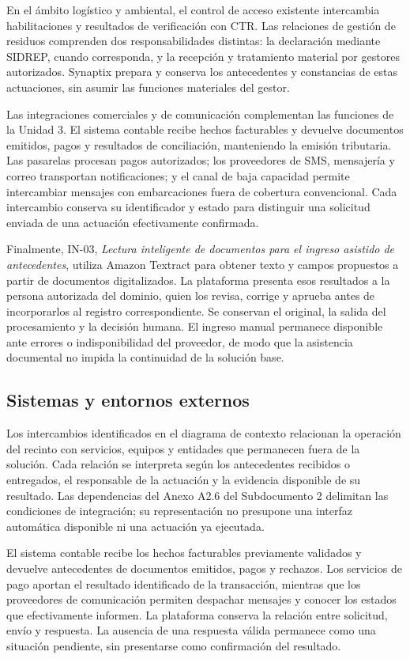 En el ámbito logístico y ambiental, el control de acceso
existente intercambia habilitaciones y resultados de verificación
con CTR. Las relaciones de gestión de residuos comprenden
dos responsabilidades distintas: la declaración mediante SIDREP,
cuando corresponda, y la recepción y tratamiento material
por gestores autorizados. Synaptix prepara y conserva
los antecedentes y constancias de estas actuaciones,
sin asumir las funciones materiales del gestor.

Las integraciones comerciales y de comunicación complementan
las funciones de la Unidad 3. El sistema contable recibe
hechos facturables y devuelve documentos emitidos, pagos
y resultados de conciliación, manteniendo la emisión tributaria.
Las pasarelas procesan pagos autorizados; los proveedores
de SMS, mensajería y correo transportan notificaciones;
y el canal de baja capacidad permite intercambiar mensajes
con embarcaciones fuera de cobertura convencional.
Cada intercambio conserva su identificador y estado
para distinguir una solicitud enviada de una actuación
efectivamente confirmada.

Finalmente, IN-03, \textit{Lectura inteligente de documentos para el ingreso asistido de antecedentes},
utiliza Amazon Textract para obtener texto y campos propuestos
a partir de documentos digitalizados. La plataforma presenta
esos resultados a la persona autorizada del dominio,
quien los revisa, corrige y aprueba antes de incorporarlos
al registro correspondiente. Se conservan el original,
la salida del procesamiento y la decisión humana.
El ingreso manual permanece disponible ante errores
o indisponibilidad del proveedor, de modo que la asistencia
documental no impida la continuidad de la solución base.


\subsection{Sistemas y entornos externos}

Los intercambios identificados en el diagrama de contexto relacionan la
operación del recinto con servicios, equipos y entidades que permanecen
fuera de la solución. Cada relación se interpreta según los antecedentes
recibidos o entregados, el responsable de la actuación y la evidencia
disponible de su resultado. Las dependencias del Anexo A2.6 del
Subdocumento 2 delimitan las condiciones de integración; su representación
no presupone una interfaz automática disponible ni una actuación ya
ejecutada.

El sistema contable recibe los hechos facturables previamente validados
y devuelve antecedentes de documentos emitidos, pagos y rechazos. Los
servicios de pago aportan el resultado identificado de la transacción,
mientras que los proveedores de comunicación permiten despachar mensajes
y conocer los estados que efectivamente informen. La plataforma conserva
la relación entre solicitud, envío y respuesta. La ausencia de una
respuesta válida permanece como una situación pendiente, sin presentarse
como confirmación del resultado.

